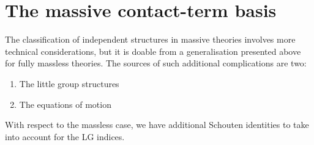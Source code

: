 \documentclass[aps,prd,nofootinbib,twocolumn,10pt]{revtex4-2}
\begin{document}
\section{The massive contact-term basis}

The classification of independent structures in massive theories involves more technical considerations, but it is doable from a generalisation presented above for fully massless theories. The sources of such additional complications are two:
\begin{enumerate}
	\item The little group structures
	\item The equations of motion
\end{enumerate}
With respect to the massless case, we have additional Schouten identities to take into account for the LG indices.
\end{document}
